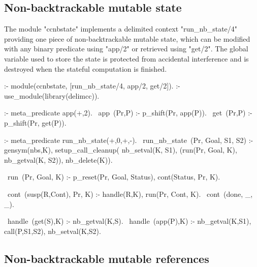 \subsection{Non-backtrackable mutable state}
\label{app:ccnbstate}

The module "ccnbstate" implements a delimited context "run_nb_state/4"
providing one piece of non-backtrackable mutable state, which can be modified with any binary predicate
using "app/2" or retrieved using "get/2". The global variable used to store the state
is protected from accidental interference and is destroyed when the stateful
computation is finished. 
\begin{prolog-framed}[name=ccnbstate]
  :- module(ccnbstate, [run_nb_state/4, app/2, get/2]).
  :- use_module(library(delimcc)).

  :- meta_predicate app(+,2).
  ~app~(Pr,P) :- p_shift(Pr, app(P)).
  ~get~(Pr,P) :- p_shift(Pr, get(P)).

  :- meta_predicate run_nb_state(+,0,+,-).
  ~run_nb_state~(Pr, Goal, S1, S2) :-
     gensym(nbs,K),
     setup_call_cleanup( nb_setval(K, S1),
                         (run(Pr, Goal, K), nb_getval(K, S2)),
                         nb_delete(K)).

  ~run~(Pr, Goal, K) :- p_reset(Pr, Goal, Status), cont(Status, Pr, K).

  ~cont~(susp(R,Cont), Pr, K) :- handle(R,K), run(Pr, Cont, K).
  ~cont~(done, _, _).

  ~handle~(get(S),K) :- nb_getval(K,S).
  ~handle~(app(P),K) :- nb_getval(K,S1), call(P,S1,S2), nb_setval(K,S2).
\end{prolog-framed}

\subsection{Non-backtrackable mutable references}
\label{app:ccnbref}

